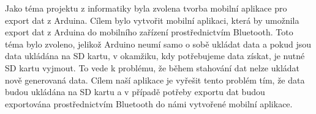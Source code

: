 \hspace{1 cm}
Jako téma projektu z informatiky byla zvolena tvorba mobilní aplikace pro export dat z Arduina. Cílem bylo vytvořit mobilní aplikaci, která by umožnila export dat z Arduina do mobilního zařízení prostřednictvím Bluetooth. Toto téma bylo zvoleno, jelikož Arduino neumí samo o sobě ukládat data a pokud jsou data ukládána na SD kartu, v okamžiku, kdy potřebujeme data získat, je nutné SD kartu vyjmout. To vede k problému, že během stahování dat nelze ukládat nově generovaná data. Cílem naší aplikace je vyřešit tento problém tím, že data budou ukládána na SD kartu a v případě potřeby exportu dat budou exportována prostřednictvím Bluetooth do námi vytvořené mobilní aplikace.